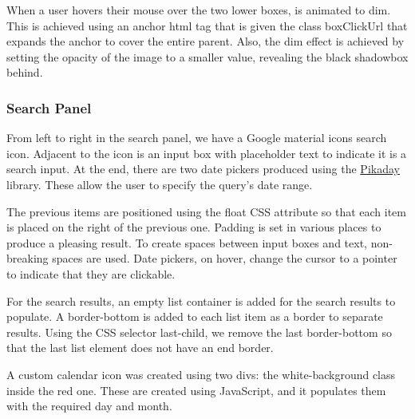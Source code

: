 \documentclass[10pt]{article}
\begin{document}
                When a user hovers their mouse over the two lower boxes, is animated to dim. This is achieved using an anchor html tag that is given the class boxClickUrl that expands the anchor to cover the entire parent. Also, the dim effect is achieved by setting the opacity of the image to a smaller value, revealing the black shadowbox behind.

            \subsubsection{Search Panel}
                From left to right in the search panel, we have a Google material icons search icon. Adjacent to the icon is an input box with placeholder text to indicate it is a search input. At the end, there are two date pickers produced using the \href{https://github.com/dbushell/Pikaday}{Pikaday} library. These allow the user to specify the query's date range.

                The previous items are positioned using the float CSS attribute so that each item is placed on the right of the previous one. Padding is set in various places to produce a pleasing result.  To create spaces between input boxes and text, non-breaking spaces are used. Date pickers, on hover, change the cursor to a pointer to indicate that they are clickable.

                For the search results, an empty list container is added for the search results to populate. A border-bottom is added to each list item as a border to separate results. Using the CSS selector last-child, we remove the last border-bottom so that the last list element does not have an end border.

                A custom calendar icon was created using two divs: the white-background class inside the red one. These are created using JavaScript, and it populates them with the required day and month.
\end{document}
